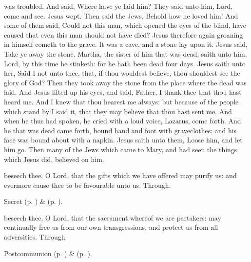 was troubled, And said, Where have ye laid him? They said unto him, Lord, come and see. Jesus wept. Then said the Jews, Behold how he loved him! And some of them said, Could not this man, which opened the eyes of the blind, have caused that even this man should not have died? Jesus therefore again groaning in himself cometh to the grave. It was a cave, and a stone lay upon it. Jesus said, Take ye away the stone. Martha, the sister of him that was dead, saith unto him, Lord, by this time he stinketh: for he hath been dead four days. Jesus saith unto her, Said I not unto thee, that, if thou wouldest believe, thou shouldest see the glory of God? Then they took away the stone from the place where the dead was laid. And Jesus lifted up his eyes, and said, Father, I thank thee that thou hast heard me. And I knew that thou hearest me always: but because of the people which stand by I said it, that they may believe that thou hast sent me. And when he thus had spoken, he cried with a loud voice, Lazarus, come forth. And he that was dead came forth, bound hand and foot with graveclothes: and his face was bound about with a napkin. Jesus saith unto them, Loose him, and let him go. Then many of the Jews which came to Mary, and had seen the things which Jesus did, believed on him.


\secret
{} beseech thee, O Lord, that the gifts which we have offered may purify us: and evermore cause thee to be favourable unto us. Through.


\begin{rubric}
     Secret  (p. \pageref{AshWednesdayMassSecret}) \&   (p. \pageref{SPLivingDeparted}).
\end{rubric}


\postcommunion
{} beseech thee, O Lord, that the sacrament whereof we are partakers: may continually free us from our own transgressions, and protect us from all adversities. Through.
\begin{rubric}
     Postcommunion  (p. \pageref{AshWednesdayMassPostcommunion}) \&   (p. \pageref{SPLivingDeparted}).
\end{rubric}

